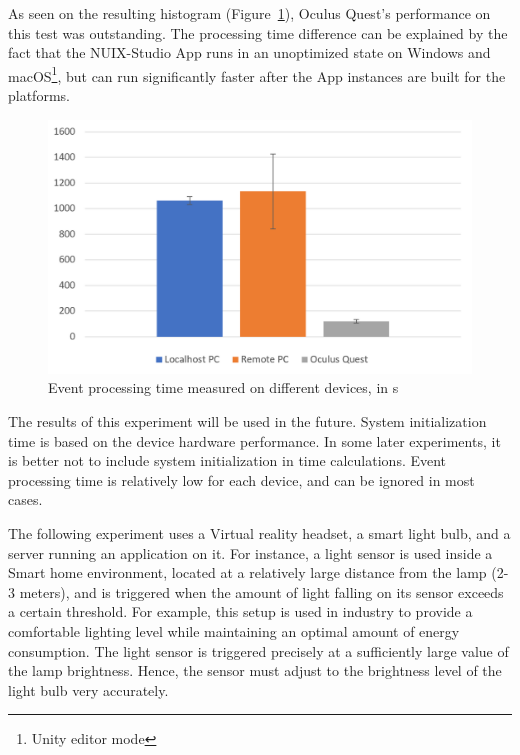 As seen on the resulting histogram (Figure~\ref{fig:EventProcessingTime-figure}), Oculus Quest's performance on this test was outstanding. The processing time difference can be explained by the fact that the NUIX-Studio App runs in an unoptimized state on Windows and macOS\footnote{Unity editor mode}, but can run significantly faster after the App instances are built for the platforms.

\begin{figure}
  \centering
  \includegraphics[width = 0.9 \linewidth]{figures/EventProcessingTime.png}
  \caption{Event processing time measured on different devices, in \textmu{}s}
  \label{fig:EventProcessingTime-figure}
\end{figure}

The results of this experiment will be used in the future. System initialization time is based on the device hardware performance. In some later experiments, it is better not to include system initialization in time calculations. Event processing time is relatively low for each device, and can be ignored in most cases.

The following experiment uses a Virtual reality headset, a smart light bulb, and a server running an application on it. For instance, a light sensor is used inside a Smart home environment, located at a relatively large distance from the lamp (2-3 meters), and is triggered when the amount of light falling on its sensor exceeds a certain threshold. For example, this setup is used in industry to provide a comfortable lighting level while maintaining an optimal amount of energy consumption. The light sensor is triggered precisely at a sufficiently large value of the lamp brightness. Hence, the sensor must adjust to the brightness level of the light bulb very accurately.

